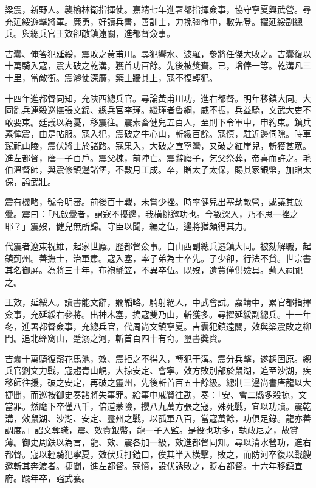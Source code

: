\begin{pinyinscope}
梁震，新野人。襲榆林衛指揮使。嘉靖七年進署都指揮僉事，協守寧夏興武營。尋充延綏遊擊將軍。廉勇，好讀兵書，善訓士，力挽彊命中，數先登。擢延綏副總兵。與總兵官王效卻敵鎮遠關，進都督僉事。

吉囊、俺答犯延綏，震敗之黃甫川。尋犯響水、波羅，參將任傑大敗之。吉囊復以十萬騎入寇，震大破之乾溝，獲首功百餘。先後被獎賚。已，增俸一等。乾溝凡三十里，當敵衝。震濬使深廣，築土牆其上，寇不復輕犯。

十四年進都督同知，充陜西總兵官。尋論黃甫川功，進右都督。明年移鎮大同。大同亂兵連殺巡撫張文錦、總兵官李瑾。繼瑾者魯綱，威不振，兵益驕，文武大吏不敢要束。廷議以為憂，移震往。震素畜健兒五百人，至則下令軍中，申約束。鎮兵素憚震，由是帖服。寇入犯，震破之牛心山，斬級百餘。寇慎，駐近邊伺隙。時車駕祀山陵，震伏將士於諸路。寇果入，大破之宣寧灣，又破之紅崖兒，斬獲甚眾。進左都督，蔭一子百戶。震父棟，前陣亡。震辭廕子，乞父祭葬，帝喜而許之。毛伯溫督師，與震修鎮邊諸堡，不數月工成。卒，贈太子太保，賜其家銀幣，加贈太保，謚武壯。

震有機略，號令明審。前後百十戰，未嘗少挫。時率健兒出塞劫敵營，或議其啟釁。震曰：「凡啟釁者，謂寇不擾邊，我橫挑邀功也。今數深入，乃不思一挫之耶？」震歿，健兒無所歸。守臣以聞，編之伍，邊將猶頗得其力。

代震者遼東祝雄，起家世廕。歷都督僉事。自山西副總兵遷鎮大同。被劾解職，起鎮薊州。善撫士，治軍肅。寇入塞，率子弟為士卒先。子少卻，行法不貸。世宗書其名御屏。為將三十年，布袍氈笠，不異卒伍。既歿，遺貲僅供殮具。薊人祠祀之。

王效，延綏人。讀書能文辭，嫻韜略。騎射絕人，中武會試。嘉靖中，累官都指揮僉事，充延綏右參將。出神木塞，搗寇雙乃山，斬獲多。尋擢延綏副總兵。十一年冬，進署都督僉事，充總兵官，代周尚文鎮寧夏。吉囊犯鎮遠關，效與梁震敗之柳門。追北蜂窩山，蹙溺之河，斬首百四十有奇。璽書獎賚。

吉囊十萬騎復窺花馬池，效、震拒之不得入，轉犯干溝。震分兵擊，遂趨固原。總兵官劉文力戰，寇趨青山峴，大掠安定、會寧。效方敗別部於鼠湖，追至沙湖，疾移師往援，破之安定，再破之靈州，先後斬首百五十餘級。總制三邊尚書唐龍以大捷聞，而巡按御史奏諸將失事罪。給事中戚賢往勘，奏：「安、會二縣多殺掠，文當罪。然麾下卒僅八千，倍道蒙險，攖八九萬方張之寇，殊死戰，宜以功贖。震乾溝，效鼠湖、沙湖、安定、靈州之戰，以孤軍八百，當寇萬餘，功俱足錄。龍亦善調度。」詔文奪職，震、效賚銀幣，龍一子入監。是役也功多，執政尼之，故賞薄。御史周鈇以為言，龍、效、震各加一級，效進都督同知。尋以清水營功，進右都督。寇以輕騎犯寧夏，效伏兵打鎧口，俟其半入橫擊，敗之，而防河卒復以戰艘邀斬其奔渡者。捷聞，進左都督。寇憤，設伏誘敗之，貶右都督。十六年移鎮宣府。踰年卒，謚武襄。


\end{pinyinscope}
